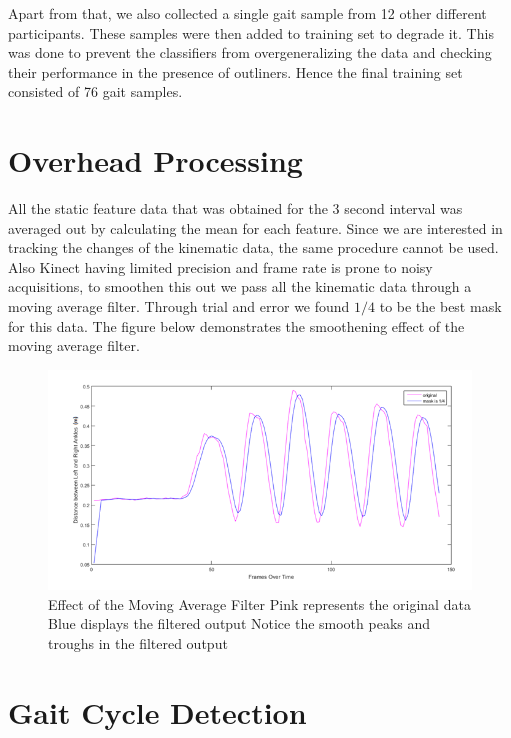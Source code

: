 \noindent Apart from that, we also collected a single gait sample from 12 other different participants. These samples were then added to training set to degrade it. This was done to prevent the classifiers from overgeneralizing the data and checking their performance in the presence of outliners. Hence the final training set consisted of 76 gait samples.

\newpage
\section{Overhead Processing} \label{Overhead Processing} 
\noindent All the static feature data that was obtained for the 3 second interval was averaged out by calculating the mean for each feature.                                                                                                                                                                                                               Since we are interested in tracking the changes of the kinematic data, the same procedure cannot be used. Also Kinect having limited precision and frame rate is prone to noisy acquisitions, to smoothen this out we pass all the kinematic data through a moving average filter. Through trial and error we found $1/4$ to be the best mask for this data.
The figure below demonstrates the smoothening effect of the moving average filter.

\begin{figure}[h]
\centering
\includegraphics[scale=0.7]{filter.png}
\caption{Effect of the Moving Average Filter Pink represents the original data Blue displays the filtered output Notice the smooth peaks and troughs in the filtered output
}
\end{figure}
\newpage
\section{Gait Cycle Detection} \label{Gait Cycle Detection} 

